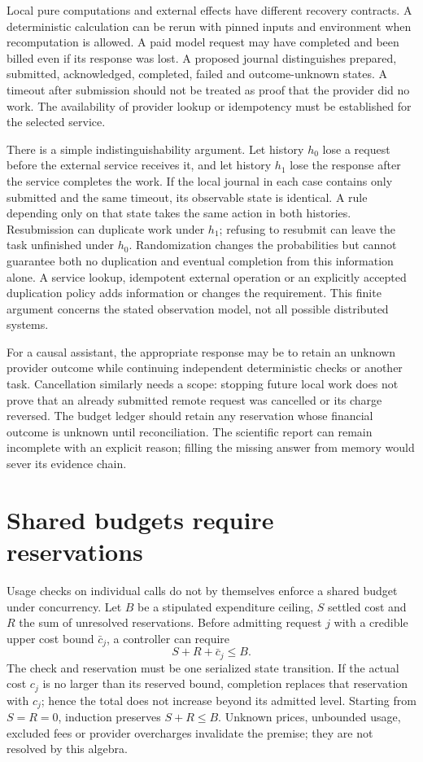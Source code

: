 Local pure computations and external effects have different recovery
contracts. A deterministic calculation can be rerun with pinned inputs and
environment when recomputation is allowed. A paid model request may have
completed and been billed even if its response was lost. A proposed journal
distinguishes prepared, submitted, acknowledged, completed, failed and
outcome-unknown states. A timeout after submission should not be treated as
proof that the provider did no work. The availability of provider lookup or
idempotency must be established for the selected service.
\cite{exec14_l6_design}

There is a simple indistinguishability argument. Let history $h_0$ lose a
request before the external service receives it, and let history $h_1$
lose the response after the service completes the work. If the local
journal in each case contains only submitted and the same timeout, its
observable state is identical. A rule depending only on that state takes
the same action in both histories. Resubmission can duplicate work under
$h_1$; refusing to resubmit can leave the task unfinished under $h_0$.
Randomization changes the probabilities but cannot guarantee both no
duplication and eventual completion from this information alone. A service
lookup, idempotent external operation or an explicitly accepted duplication
policy adds information or changes the requirement. This finite argument
concerns the stated observation model, not all possible distributed
systems.\cite{exec14_l6_exact}

For a causal assistant, the appropriate response may be to retain an
unknown provider outcome while continuing independent deterministic checks
or another task. Cancellation similarly needs a scope: stopping future
local work does not prove that an already submitted remote request was
cancelled or its charge reversed. The budget ledger should retain any
reservation whose financial outcome is unknown until reconciliation. The
scientific report can remain incomplete with an explicit reason; filling
the missing answer from memory would sever its evidence chain.

\section{Shared budgets require reservations}

Usage checks on individual calls do not by themselves enforce a shared
budget under concurrency. Let $B$ be a stipulated expenditure ceiling,
$S$ settled cost and $R$ the sum of unresolved reservations. Before admitting
request $j$ with a credible upper cost bound $\bar c_j$, a controller can
require
\begin{equation}
 S+R+\bar c_j\le B.
 \label{exec14:l6-reserve}
\end{equation}
The check and reservation must be one serialized state transition. If the
actual cost $c_j$ is no larger than its reserved bound, completion replaces
that reservation with $c_j$; hence the total does not increase beyond its
admitted level. Starting from $S=R=0$, induction preserves $S+R\le B$.
Unknown prices, unbounded usage, excluded fees or provider overcharges
invalidate the premise; they are not resolved by this algebra.
\cite{exec14_l6_exact}

